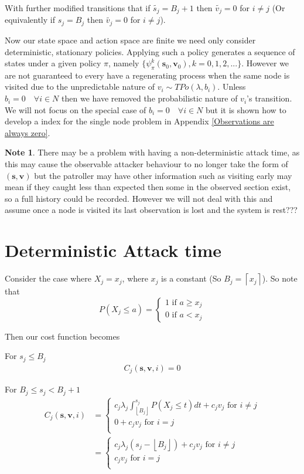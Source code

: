 \documentclass[a4paper,10pt]{article}
\newcommand{\floor}[1]{\left \lfloor #1 \right \rfloor}
\newcommand{\ceil}[1]{\left \lceil #1 \right \rceil}
\theoremstyle{definition}
\theoremstyle{definition}
\theoremstyle{remark}
\theoremstyle{definition}
\newtheorem*{note}{Note}
\begin{document}
With further modified transitions that if $\widetilde{s_{j}} =B_{j}+1$ then $\widetilde{v_{j}}=0$ for $i \neq j$ (Or equivalently if $s_{j}=B_{j}$ then $\widetilde{v_{j}}=0$ for $i \neq j$). 

Now our state space and action space are finite we need only consider deterministic, stationary policies. Applying such a policy generates a sequence of states under a given policy $\pi$, namely $\{\psi_{\pi}^{k}(\bm{s}_{0},\bm{v}_{0}), k=0,1,2,... \}$. However we are not guaranteed to every have a regenerating process when the same node is visited due to the unpredictable nature of $v_{i} \sim TPo(\lambda,b_{i})$. Unless $b_{i}=0 \quad \forall i \in N$ then we have removed the probabilistic nature of $v_{i}$'s transition. We will not focus on the special case of $b_{i}=0 \quad \forall i \in N$ but it is shown how to develop a index for the single node problem in Appendix \ref{Observations are always zero}.

\begin{note}
There may be a problem with having a non-deterministic attack time, as this may cause the observable attacker behaviour to no longer take the form of $(\bm{s},\bm{v})$ but the patroller may have other information such as visiting early may mean if they caught less than expected then some in the observed section exist, so a full history could be recorded. However we will not deal with this and assume once a node is visited its last observation is lost and the system is rest???
\end{note}

\section{Deterministic Attack time}
Consider the case where $X_{j}=x_{j}$, where $x_{j}$ is a constant (So $B_{j}=\ceil{x_{j}}$). So note that 
$$P(X_{j} \leq a)=\begin{cases}
1 \text{ if } a \geq x_{j} \\
0 \text{ if } a < x_{j}
\end{cases}$$

Then our cost function becomes

For $s_{j} \leq B_{j}$
\begin{align*}
C_{j}(\bm{s},\bm{v},i)=0
\end{align*}

For $B_{j} \leq s_{j} < B_{j}+1$
\begin{align*}
C_{j}(\bm{s},\bm{v},i)&=\begin{cases}
c_{j} \lambda_{j} \int_{\floor{B_{j}}}^{s_{j}} P(X_{j} \leq t) dt + c_{j} v_{j} \text{ for } i \neq j \\
0+c_{j} v_{j} \text{ for } i=j \\
\end{cases} \\
&=\begin{cases}
c_{j} \lambda_{j}(s_{j}-\floor{B_{j}}) + c_{j} v_{j} \text { for } i \neq j \\
c_{j} v_{j} \text{ for } i=j \\
\end{cases}
\end{align*}
\end{document}
